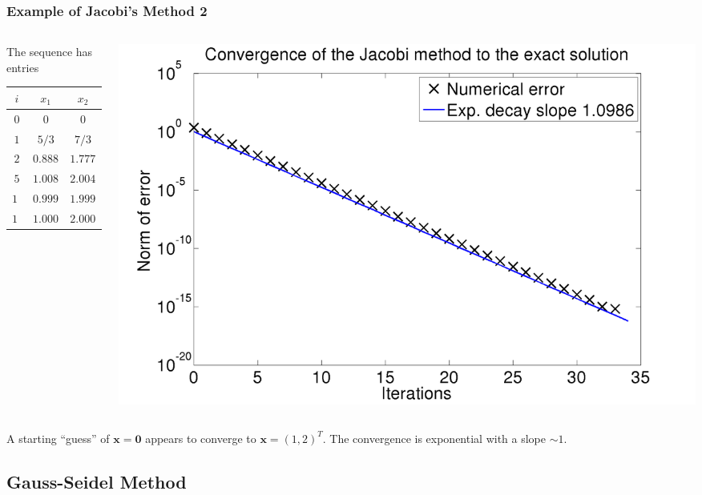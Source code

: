 \documentclass{beamer}
\newcommand{\bx}{{\boldsymbol{x}}}
\newcommand{\bfm}[1]{{\boldsymbol{#1}}}
\begin{document}
\begin{frame}
  \frametitle{Example of Jacobi's Method 2}

  \begin{columns}
    \begin{column}{0.475\textwidth}
      The sequence has entries
      \begin{tabular}{|c|c c|}
        $i$ & $x_1$ & $x_2$ \\ \hline
        $0$ & $0$ & $0$ \\
        $1$ & $5 / 3$ & $7 / 3$ \\
        $2$ & $0.888889$ & $1.777778$ \\
        $5$ & $1.008230$ & $2.004115$ \\
        $10$ & $0.999983$ & $1.999966$ \\
        $100$ & $1.000000$ & $2.000000$
      \end{tabular}
    \end{column}
    \begin{column}{0.525\textwidth}
      \begin{center}
        \includegraphics[width=\textwidth]{figures/Jacobi1}
      \end{center}
    \end{column}
  \end{columns}

  \vspace{1ex}

  A starting ``guess'' of $\bx = \bfm{0}$ appears to converge to $\bx
  = (1, 2)^T$. The convergence is exponential with a slope $\sim 1$.

\end{frame}


\subsection{Gauss-Seidel Method}
\end{document}

